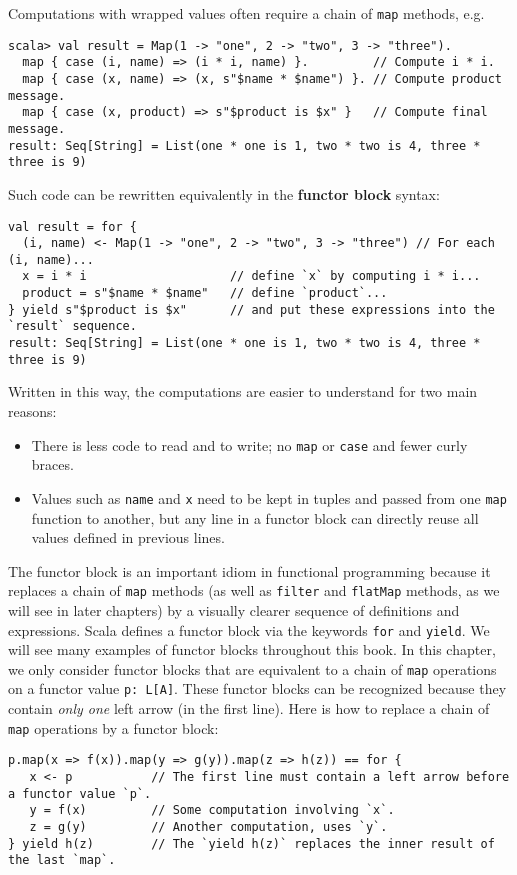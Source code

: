 Computations with wrapped values often require a chain of \lstinline!map!
methods, e.g.
\begin{lstlisting}
scala> val result = Map(1 -> "one", 2 -> "two", 3 -> "three").
  map { case (i, name) => (i * i, name) }.         // Compute i * i.
  map { case (x, name) => (x, s"$name * $name") }. // Compute product message.
  map { case (x, product) => s"$product is $x" }   // Compute final message.
result: Seq[String] = List(one * one is 1, two * two is 4, three * three is 9)
\end{lstlisting}
Such code can be rewritten equivalently in the \textbf{functor
block} syntax:
\begin{lstlisting}
val result = for {
  (i, name) <- Map(1 -> "one", 2 -> "two", 3 -> "three") // For each (i, name)...
  x = i * i                    // define `x` by computing i * i...
  product = s"$name * $name"   // define `product`...
} yield s"$product is $x"      // and put these expressions into the `result` sequence.
result: Seq[String] = List(one * one is 1, two * two is 4, three * three is 9) 
\end{lstlisting}
Written in this way, the computations are easier to understand for
two main reasons:
\begin{itemize}
\item There is less code to read and to write; no \lstinline!map! or \lstinline!case!
and fewer curly braces.
\item Values such as \lstinline!name! and \lstinline!x! need to be kept
in tuples and passed from one \lstinline!map! function to another,
but any line in a functor block can directly reuse all values defined
in previous lines.
\end{itemize}
The functor block is an important idiom in functional programming
because it replaces a chain of \lstinline!map! methods (as well as
\lstinline!filter! and \lstinline!flatMap! methods, as we will see
in later chapters) by a visually clearer sequence of definitions and
expressions. Scala defines a functor block via the keywords \lstinline!for!
and \lstinline!yield!. We will see many examples of functor blocks
throughout this book. In this chapter, we only consider functor blocks
that are equivalent to a chain of \lstinline!map! operations on a
functor value \lstinline!p: L[A]!. These functor blocks can be recognized
because they contain \emph{only one} left arrow (in the first line).
Here is how to replace a chain of \lstinline!map! operations by a
functor block:
\begin{lstlisting}
p.map(x => f(x)).map(y => g(y)).map(z => h(z)) == for {
   x <- p           // The first line must contain a left arrow before a functor value `p`.
   y = f(x)         // Some computation involving `x`.
   z = g(y)         // Another computation, uses `y`.
} yield h(z)        // The `yield h(z)` replaces the inner result of the last `map`.
\end{lstlisting}
